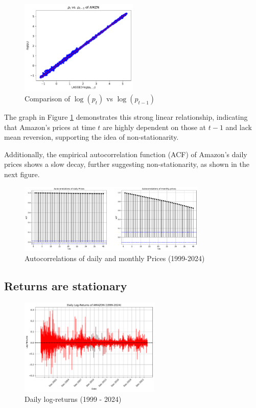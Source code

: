 \documentclass{article}
\begin{document}
\begin{figure}[H]
    \centering
    \includegraphics[width=0.5\textwidth]{Img/Laggedlog(p_t-1).pdf}
    \caption{Comparison of \( \log(p_t) \) vs \( \log(p_{t-1}) \)}
    \label{fig:LogptVSLogpt-1}
\end{figure}

\noindent The graph in Figure \ref{fig:LogptVSLogpt-1} demonstrates this strong linear 
relationship, indicating that Amazon's prices at time \( t \) are highly dependent on those at \( t-1 \) and lack mean reversion,
 supporting the idea of non-stationarity.

\noindent Additionally, the empirical autocorrelation function (ACF) of Amazon's daily prices shows a slow decay, further suggesting non-stationarity, as shown in the next figure.

\begin{figure}[H]
    \centering
    \includegraphics[width=0.8\textwidth]{Img/Autocorrel_daily_monthly.pdf}
    \caption{Autocorrelations of daily and monthly Prices (1999-2024)}
    \label{fig:Autocorrelations_daily_monthly}
\end{figure}

\subsection{Returns are stationary}

\begin{figure}[H]
    \centering
    \includegraphics[width=0.6\textwidth]{Img/Daily_Log_Returns.pdf}
    \caption{Daily log-returns (1999 - 2024)}
    \label{fig:Daily_log_returns}
\end{figure}
\end{document}
